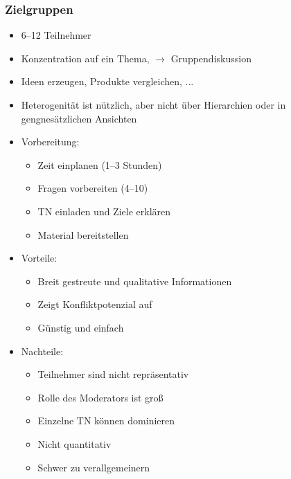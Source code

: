 \documentclass[a4paper,10pt]{article}
\begin{document}
\subsubsection{Zielgruppen}
\begin{itemize}
	\item 6--12 Teilnehmer
	\item Konzentration auf ein Thema, $\rightarrow$ Gruppendiskussion
	\item Ideen erzeugen, Produkte vergleichen, ...
	\item Heterogenität ist nützlich, aber nicht über Hierarchien oder in gengnesätzlichen Ansichten
	\item Vorbereitung:
	\begin{itemize}
		\item Zeit einplanen (1--3 Stunden)
		\item Fragen vorbereiten (4--10)
		\item TN einladen und Ziele erklären
		\item Material bereitstellen
	\end{itemize}
	\item Vorteile:
	\begin{itemize}
		\item Breit gestreute und qualitative Informationen
		\item Zeigt Konfliktpotenzial auf
		\item Günstig und einfach
	\end{itemize}
	\item Nachteile:
	\begin{itemize}
		\item Teilnehmer sind nicht repräsentativ
		\item Rolle des Moderators ist groß
		\item Einzelne TN können dominieren
		\item Nicht quantitativ
		\item Schwer zu verallgemeinern
	\end{itemize}
\end{itemize}
\end{document}
